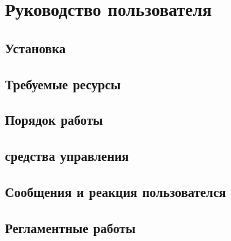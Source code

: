 \chapter{Руководство пользователя} %
\label{ch:usrmanual}

\section{Установка}

\section{Требуемые ресурсы}

\section{Порядок работы}

\section{средства управления}

\section{Сообщения и реакция пользователся} %

\section{Регламентные работы} %